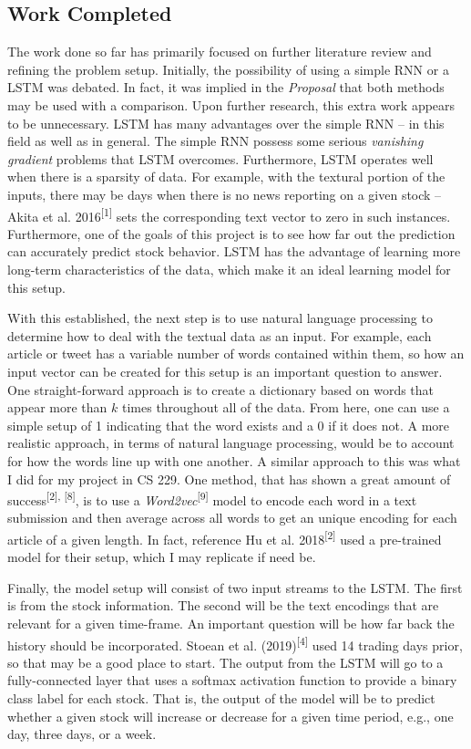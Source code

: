 \documentclass{article}
\begin{document}
\subsection*{Work Completed}
The work done so far has primarily focused on further literature review and
refining the problem setup. Initially, the possibility of using a simple RNN or
a LSTM was debated. In fact, it was implied in the \textit{Proposal} that both
methods may be used with a comparison. Upon further research, this extra work appears
to be unnecessary. LSTM has many advantages over the simple RNN -- in this field
as well as in general. The simple RNN possess some serious \textit{vanishing
gradient} problems that LSTM overcomes. Furthermore, LSTM operates well when
there is a sparsity of data. For example, with the textural portion of the
inputs, there may be days when there is no news reporting on a given stock --
Akita et al. 2016\textsuperscript{[1]} sets the corresponding text vector to
zero in such instances. Furthermore, one of the goals of this project is to see
how far out the prediction can accurately predict stock behavior. LSTM has the
advantage of learning more long-term characteristics of the data, which make it
an ideal learning model for this setup.

With this established, the next step is to use natural language processing to
determine how to deal with the textual data as an input. For example, each
article or tweet has a variable number of words contained within them, so how
an input vector can be created for this setup is an important question to answer. One
straight-forward approach is to create a dictionary based on words that appear
more than $k$ times throughout all of the data. From here, one can use a simple
setup of 1 indicating that the word exists and a 0 if it does not. A more
realistic approach, in terms of natural language processing, would be to account for how
the words line up with one another. A similar approach to this was what I did for
my project in CS 229. One method, that has shown a great amount of
success\textsuperscript{[2], [8]}, is to use a \textit{Word2vec}\textsuperscript{[9]} model to encode
each word in a text submission and then average across all words to get an
unique encoding for each article of a given length. In fact, reference Hu et al.
2018\textsuperscript{[2]} used a pre-trained model for their setup, which I may
replicate if need be.

Finally, the model setup will consist of two input streams to the LSTM. The
first is from the stock information. The second will be the text encodings that
are relevant for a given time-frame. An important question will be how far back
the history should be incorporated. Stoean et al. (2019)\textsuperscript{[4]}
used 14 trading days prior, so that may be a good place to start. The output
from the LSTM will go to a fully-connected layer that uses a softmax activation
function to provide a binary class label for each stock. That is, the output of
the model will be to predict whether a given stock will increase or decrease
for a given time period, e.g., one day, three days, or a week.
\end{document}
